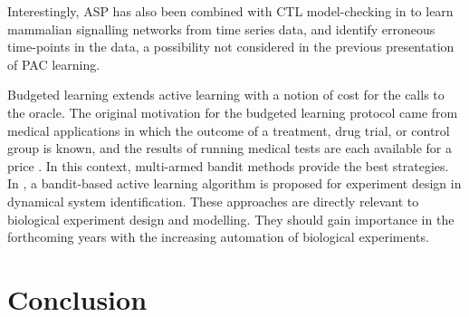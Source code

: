 \documentclass{llncs}
\begin{document}
Interestingly, ASP has also been combined with CTL model-checking in \cite{OPSSG16biosystems} to learn mammalian signalling networks from time series data, 
and identify erroneous time-points in the data, a possibility not considered in the previous presentation of PAC learning.


Budgeted learning extends active learning with a notion of cost for the calls to the oracle.
The original motivation for the budgeted learning protocol came from medical applications in which the outcome of a treatment,
drug trial, or control group is known, and the results of running medical tests are each available for a price \cite{DZBSM13ml}.
In this context, multi-armed bandit methods \cite{DBSSZ07icdm} provide the best strategies.
In \cite{LMALS14ecml}, a bandit-based active learning algorithm is proposed for experiment design in dynamical system identification.
These approaches are directly relevant to biological experiment design and modelling. %
They should gain importance in the forthcoming years with the increasing automation of biological experiments.


\section{Conclusion}



\end{document}

